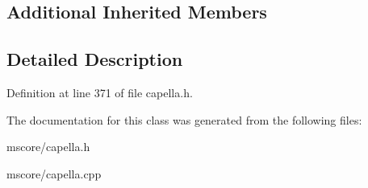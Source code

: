 \subsection*{Additional Inherited Members}


\subsection{Detailed Description}


Definition at line 371 of file capella.\+h.



The documentation for this class was generated from the following files\+:\begin{DoxyCompactItemize}
\item 
mscore/capella.\+h\item 
mscore/capella.\+cpp\end{DoxyCompactItemize}

